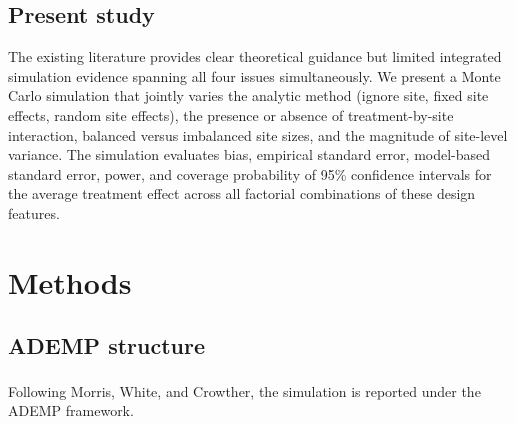\documentclass[
  11pt,
]{article}
\begin{document}
\subsection{Present study}\label{present-study}

The existing literature provides clear theoretical guidance
but limited integrated simulation evidence spanning all
four issues simultaneously. We present a Monte
Carlo simulation that jointly varies the analytic method
(ignore site, fixed site effects, random site effects),
the presence or absence of treatment-by-site interaction,
balanced versus imbalanced site sizes, and the magnitude
of site-level variance. The simulation evaluates bias,
empirical standard error, model-based standard error,
power, and coverage probability of 95\% confidence
intervals for the average treatment effect across all
factorial combinations of these design features.

\section{Methods}\label{methods}

\subsection{ADEMP structure}\label{ademp-structure}

Following Morris, White, and Crowther\textsuperscript{}, the
simulation is reported under the ADEMP framework.
\end{document}
